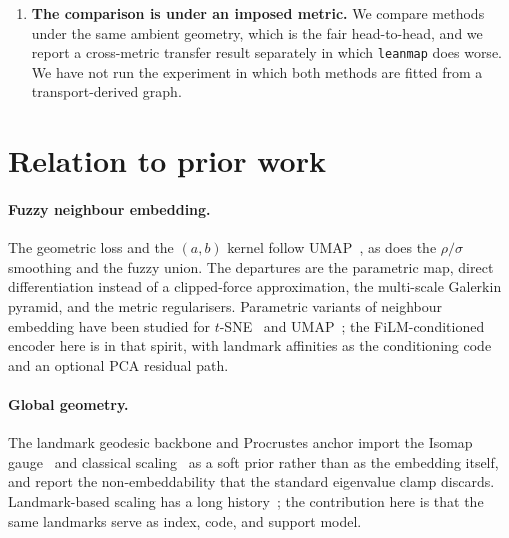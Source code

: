 \documentclass[12pt]{iopart}
\theoremstyle{definition}
\theoremstyle{plain}
\theoremstyle{remark}
\newcommand{\code}[1]{\texttt{#1}}
\begin{document}
\begin{enumerate}[leftmargin=*]
  the data --- matched noise and feature permutation --- and therefore covers
  the failure families those constructions represent, not the ones a particular
  instrument actually produces. A domain-specific taxonomy would be stronger and
  the machinery accepts one.
\item \textbf{The comparison is under an imposed metric.} We compare methods
  under the same ambient geometry, which is the fair head-to-head, and we report
  a cross-metric transfer result separately in which \code{leanmap} does worse.
  We have not run the experiment in which both methods are fitted from a
  transport-derived graph.
\end{enumerate}

\section{Relation to prior work}
\label{sec:related}

\paragraph{Fuzzy neighbour embedding.}
The geometric loss and the $(a,b)$ kernel follow
UMAP~\cite{mcinnes2018umap,spivak2012fuzzy}, as does the $\rho/\sigma$
smoothing and the fuzzy union. The departures are the parametric map, direct
differentiation instead of a clipped-force approximation, the multi-scale
Galerkin pyramid, and the metric regularisers. Parametric variants of neighbour
embedding have been studied for $t$-SNE~\cite{vandermaaten2009parametric} and
UMAP~\cite{sainburg2021parametric}; the FiLM-conditioned encoder here is in
that spirit, with landmark affinities as the conditioning
code~\cite{perez2018film} and an optional PCA residual path.

\paragraph{Global geometry.}
The landmark geodesic backbone and Procrustes anchor import the Isomap
gauge~\cite{isomap2000} and classical scaling~\cite{torgerson1952} as a soft
prior rather than as the embedding itself, and report the non-embeddability
that the standard eigenvalue clamp discards. Landmark-based scaling has a long
history~\cite{desilva2004landmark}; the contribution here is that the same
landmarks serve as index, code, and support model.
\end{document}
